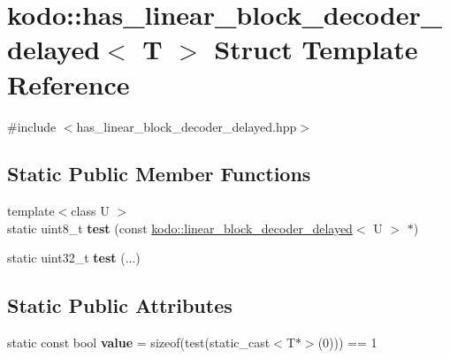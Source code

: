 \hypertarget{structkodo_1_1has__linear__block__decoder__delayed}{\section{kodo\-:\-:has\-\_\-linear\-\_\-block\-\_\-decoder\-\_\-delayed$<$ T $>$ Struct Template Reference}
\label{structkodo_1_1has__linear__block__decoder__delayed}
}


{\ttfamily \#include $<$has\-\_\-linear\-\_\-block\-\_\-decoder\-\_\-delayed.\-hpp$>$}

\subsection*{Static Public Member Functions}
\begin{DoxyCompactItemize}
\item 
\hypertarget{structkodo_1_1has__linear__block__decoder__delayed_a5dedeb60d1db803a8a3314162d321adc}{{\footnotesize template$<$class U $>$ }\\static uint8\-\_\-t {\bfseries test} (const \hyperlink{classkodo_1_1linear__block__decoder__delayed}{kodo\-::linear\-\_\-block\-\_\-decoder\-\_\-delayed}$<$ U $>$ $\ast$)}\label{structkodo_1_1has__linear__block__decoder__delayed_a5dedeb60d1db803a8a3314162d321adc}

\item 
\hypertarget{structkodo_1_1has__linear__block__decoder__delayed_a73abbc052a079457453ec1270e40798f}{static uint32\-\_\-t {\bfseries test} (...)}\label{structkodo_1_1has__linear__block__decoder__delayed_a73abbc052a079457453ec1270e40798f}

\end{DoxyCompactItemize}
\subsection*{Static Public Attributes}
\begin{DoxyCompactItemize}
\item 
\hypertarget{structkodo_1_1has__linear__block__decoder__delayed_adf4945224e07c1d8dd4bd2bd2096e240}{static const bool {\bfseries value} = sizeof(test(static\-\_\-cast$<$T$\ast$$>$(0))) == 1}\label{structkodo_1_1has__linear__block__decoder__delayed_adf4945224e07c1d8dd4bd2bd2096e240}

\end{DoxyCompactItemize}


